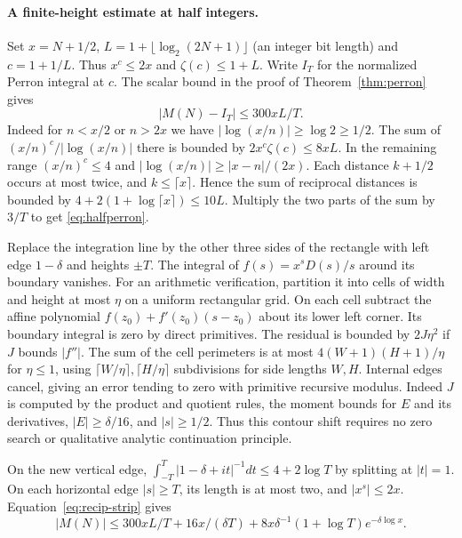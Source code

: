 \paragraph{A finite-height estimate at half integers.}
Set $x=N+1/2$, $L=1+\lfloor\log_2(2N+1)\rfloor$ (an integer bit length)
and $c=1+1/L$. Thus $x^c\le2x$ and $\zeta(c)\le1+L$. Write
$I_T$ for the normalized Perron integral at $c$. The scalar bound in
the proof of Theorem~\ref{thm:perron} gives
\begin{equation}\label{eq:halfperron}
                        |M(N)-I_T|\le 300 xL/T .
\end{equation}
Indeed for $n<x/2$ or $n>2x$ we have
$|\log(x/n)|\ge\log2\ge1/2$. The sum of
$(x/n)^c/|\log(x/n)|$ there is bounded by $2x^c\zeta(c)\le8xL$.
In the remaining range $(x/n)^c\le4$ and
$|\log(x/n)|\ge |x-n|/(2x)$. Each distance $k+1/2$ occurs at most
twice, and $k\le\lceil x\rceil$. Hence the sum of reciprocal distances
is bounded by $4+2(1+\log\lceil x\rceil)\le10L$. Multiply the two
parts of the sum by $3/T$ to get \eqref{eq:halfperron}.

Replace the integration line by the other three sides of the rectangle
with left edge $1-\delta$ and heights $\pm T$. The integral of
$f(s)=x^sD(s)/s$ around its boundary vanishes. For an arithmetic
verification, partition it into cells of width and height at most
$\eta$ on a uniform rectangular grid. On each cell subtract the affine
polynomial $f(z_0)+f'(z_0)(s-z_0)$ about its lower left corner.
Its boundary integral is zero by direct primitives. The residual is
bounded by $2J\eta^2$ if $J$ bounds $|f''|$. The sum of the
cell perimeters is at most $4(W+1)(H+1)/\eta$ for
$\eta\le1$, using $\lceil W/\eta\rceil,\lceil H/\eta\rceil$
subdivisions for side lengths $W,H$. Internal edges cancel, giving an
error tending to zero with primitive recursive modulus. Indeed $J$
is computed by the product and quotient rules, the moment bounds for
$E$ and its derivatives, $|E|\ge\delta/16$, and $|s|\ge1/2$.
Thus this contour shift requires no zero search or qualitative
analytic continuation principle.

On the new vertical edge,
$\int_{-T}^{T}|1-\delta+it|^{-1}dt\le4+2\log T$ by splitting
at $|t|=1$. On each horizontal edge $|s|\ge T$, its length is at
most two, and $|x^s|\le2x$. Equation~\eqref{eq:recip-strip} gives
\[
 |M(N)|\le 300xL/T+16x/(\delta T)
                + 8x\delta^{-1}(1+\log T)e^{-\delta\log x}.
\]

